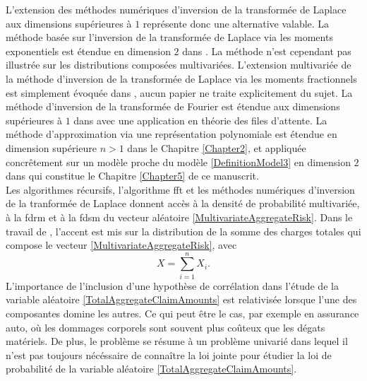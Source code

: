 L'extension des méthodes numériques d'inversion de la transformée de Laplace aux dimensions supérieures à $1$ représente donc une alternative valable. La méthode basée sur l'inversion de la transformée de Laplace via les moments exponentiels est étendue en dimension $2$ dans \citet{Mn11}. La méthode n\rq{}est cependant pas illustrée sur les distributions composées multivariées. L'extension multivariée de la méthode d'inversion de la transformée de Laplace via les moments fractionnels est simplement évoquée dans \citet{GzTa12}, aucun papier ne traite explicitement du sujet. La méthode d'inversion de la transformée de Fourier est étendue aux dimensions supérieures à $1$ dans \citet{ChLuWh94} avec une application en théorie des files d'attente. La méthode d\rq{}approximation via une représentation polynomiale est étendue en dimension supérieure $n>1$ dans le Chapitre \ref{Chapter2}, et appliquée concrêtement sur un modèle proche du modèle \ref{DefinitionModel3} en dimension $2$ dans \citet{GoLoPo15b} qui constitue le Chapitre \ref{Chapter5} de ce manuscrit.\\ 

Les algorithmes récursifs, l'algorithme \gls{fft} et les méthodes numériques d'inversion de la tranformée de Laplace donnent accès à la densité de probabilité multivariée, à la \gls{fdrm} et à la \gls{fdsm} du vecteur aléatoire \eqref{MultivariateAggregateRisk}. Dans le travail de \citet{Am98}, l'accent est mis sur la distribution de la somme des charges totales qui compose le vecteur \ref{MultivariateAggregateRisk}, avec
\begin{equation}\label{TotalAggregateClaimAmounts}
X=\sum_{i=1}^{n}X_{i}.
\end{equation}
L\rq{}importance de l'inclusion d'une hypothèse de corrélation dans l'étude de la variable aléatoire \eqref{TotalAggregateClaimAmounts} est relativisée lorsque l'une des composantes domine les autres. Ce qui peut être le cas, par exemple en assurance auto, où les dommages corporels sont souvent plus coûteux que les dégats matériels. De plus, le problème se résume à un problème univarié dans lequel il n'est pas toujours nécéssaire de connaître la loi jointe pour étudier la loi de probabilité de la variable aléatoire \eqref{TotalAggregateClaimAmounts}.\\ 

